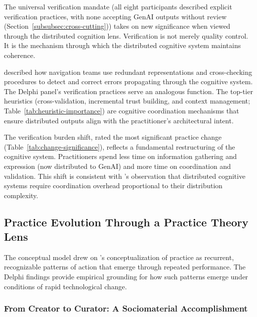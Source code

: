 The universal verification mandate (all eight participants described explicit
verification practices, with none accepting GenAI outputs without review
(Section~\ref{subsubsec:cross-cutting})) takes on new significance when viewed
through the distributed cognition lens. Verification is not merely quality
control. It is the mechanism through which the distributed cognitive system
maintains coherence.

\textcite{hutchins_cognition_1995} described how navigation teams use
redundant representations and cross-checking procedures to detect and correct
errors propagating through the cognitive system. The Delphi panel's
verification practices serve an analogous function. The top-tier heuristics (cross-validation, incremental trust building, and
context management; Table~\ref{tab:heuristic-importance}) are cognitive
coordination mechanisms that ensure distributed outputs align with the
practitioner's architectural intent.

The verification burden shift, rated the most significant practice change
(Table~\ref{tab:change-significance}), reflects a
fundamental restructuring of the cognitive system. Practitioners spend less
time on information gathering and expression (now distributed to GenAI) and
more time on coordination and validation. This shift is consistent with
\textcite{hollan_distributed_2000}'s observation that distributed cognitive
systems require coordination overhead proportional to their distribution
complexity.

\subsection{Practice Evolution Through a Practice Theory Lens}\label{subsec:disc-practice-theory}

The conceptual model drew on \textcite{feldman_theorizing_2011}'s
conceptualization of practice as recurrent, recognizable patterns of action that
emerge through repeated performance. The Delphi findings provide empirical grounding for how
such patterns emerge under conditions of rapid technological change.

\subsubsection{From Creator to Curator: A Sociomaterial Accomplishment}

